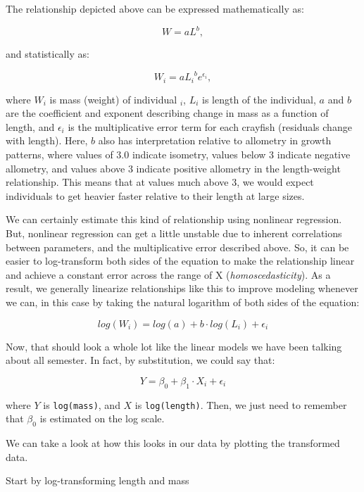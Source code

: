 \documentclass[
]{book}
\newenvironment{Shaded}{\begin{snugshade}}{\end{snugshade}}
\newcommand{\CommentTok}[1]{\textcolor[rgb]{0.56,0.35,0.01}{\textit{#1}}}
\newcommand{\KeywordTok}[1]{\textcolor[rgb]{0.13,0.29,0.53}{\textbf{#1}}}
\newcommand{\NormalTok}[1]{#1}
\newcommand{\OperatorTok}[1]{\textcolor[rgb]{0.81,0.36,0.00}{\textbf{#1}}}
\newcommand{\StringTok}[1]{\textcolor[rgb]{0.31,0.60,0.02}{#1}}
\begin{document}
The relationship depicted above can be expressed mathematically as:

\[W = aL^b,\]

and statistically as:

\[W_i = a {L_i}^b e^{\epsilon_i},\]

where \(W_i\) is mass (weight) of individual \(_i\), \(L_i\) is length of the individual, \(a\) and \(b\) are the coefficient and exponent describing change in mass as a function of length, and \(\epsilon_i\) is the multiplicative error term for each crayfish (residuals change with length). Here, \(b\) also has interpretation relative to allometry in growth patterns, where values of 3.0 indicate isometry, values below 3 indicate negative allometry, and values above 3 indicate positive allometry in the length-weight relationship. This means that at values much above 3, we would expect individuals to get heavier faster relative to their length at large sizes.

We can certainly estimate this kind of relationship using nonlinear regression. But, nonlinear regression can get a little unstable due to inherent correlations between parameters, and the multiplicative error described above. So, it can be easier to log-transform both sides of the equation to make the relationship linear and achieve a constant error across the range of X (\emph{homoscedasticity}). As a result, we generally linearize relationships like this to improve modeling whenever we can, in this case by taking the natural logarithm of both sides of the equation:

\[log(W_i) = log(a) + b \cdot log(L_i) + \epsilon_i\]

Now, that should look a whole lot like the linear models we have been talking about all semester. In fact, by substitution, we could say that:

\[Y = \beta_0 + \beta_1 \cdot X_i + \epsilon_i\]

where \(Y\) is \texttt{log(mass)}, and \(X\) is \texttt{log(length)}. Then, we just need to remember that \(\beta_0\) is estimated on the log scale.

We can take a look at how this looks in our data by plotting the transformed data.

Start by log-transforming length and mass

\begin{Shaded}
\end{Shaded}
\end{document}
